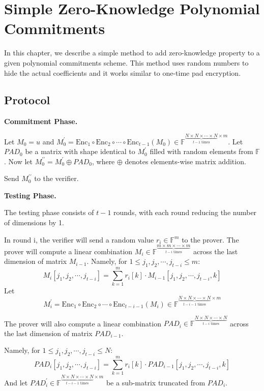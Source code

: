 \chapter{Simple Zero-Knowledge Polynomial Commitments}

In this chapter, we describe a simple method to add zero-knowledge property to a given polynomial commitments scheme. This method uses random numbers to hide the actual coefficients and it works similar to one-time pad encryption.

\section{Protocol}

\textbf{Commitment Phase.}

Let $M_0 = u$ and $ M_0^{\prime} = \text{Enc}_1 \circ \text{Enc}_2 \circ \cdots \circ \text{Enc}_{t-1} (M_0) \in \mathbb{F}^{\underbrace{N \times N \times \cdots \times N}_{t-1 \text{ times}} \times m}$.
Let $PAD_0$ be a matrix with shape identical to $M_0^\prime$ filled with random elements from $\mathbb{F}$. Now let $M_0^{\prime\prime} = M_0^{\prime} \oplus PAD_0$, where $\oplus$ denotes elements-wise matrix addition.

Send $M_0^{\prime\prime}$ to the verifier.

\textbf{Testing Phase.}

The testing phase consists of $t-1$ rounds, with each round reducing the number of dimensions by 1.

In round i, the verifier will send a random value $r_i \in \mathbb{F}^m$ to the prover.
The prover will compute a linear combination $M_i \in \mathbb{F}^{\underbrace{m \times m \times \cdots \times m}_{t-i \text{ times}}}$ across the last dimension of matrix $M_{i-1}$.
Namely, for $1 \le j_1,j_2, \cdots, j_{t-i} \le m$:
$$M_i[j_1,j_2, \cdots, j_{t-i}] = \sum_{k=1}^{m} r_{i}[k] \cdot M_{i-1}[j_1,j_2, \cdots, j_{t-i}, k]$$
Let 
$$
M_i^\prime = \text{Enc}_1 \circ \text{Enc}_2 \circ \cdots \circ \text{Enc}_{t - i - 1}(M_i)\in \mathbb{F}^{\underbrace{N \times N \times \cdots \times N}_{t-i-1 \text{ times}} \times m}
$$

The prover will also compute a linear combination $PAD_i \in \mathbb{F}^{\underbrace{N \times N \times \cdots \times N}_{t-i \text{ times}}}$ across the last dimension of matrix $PAD_{i-1}$.

Namely, for $1 \le j_1,j_2, \cdots, j_{t-i} \le N$:
$$PAD_i[j_1,j_2, \cdots, j_{t-i}] = \sum_{k=1}^{m} r_{i}[k] \cdot PAD_{i-1}[j_1,j_2, \cdots, j_{t-i}, k]$$
And let $PAD_i^\prime \in \mathbb{F}^{\underbrace{N \times N \times \cdots \times N}_{t-i-1 \text{ times}} \times m}$ be a sub-matrix truncated from $PAD_i$.

